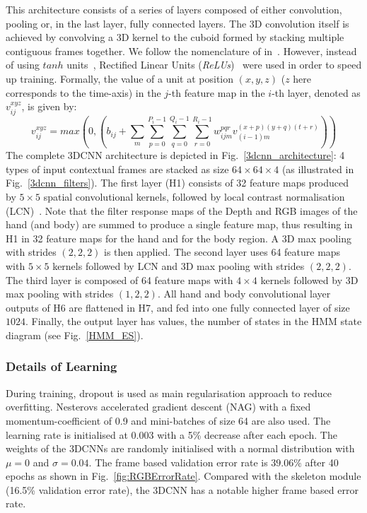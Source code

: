 This  architecture consists of a series of layers composed of either convolution, pooling or, in the last layer, fully connected layers.
The 3D convolution itself is achieved by convolving a 3D kernel to the cuboid formed by stacking multiple contiguous frames together. We follow the nomenclature of in~\cite{ji20133d}.
 However, instead of using $tanh$ units~\cite{ji20133d},  Rectified Linear Units (\emph{ReLUs})~\cite{krizhevsky2012imagenet} were used in order to speed up training.
 Formally, the value of a unit at position $(x, y, z)$ ($z$ here corresponds to the time-axis) in the $j$-th feature map in the $i$-th layer, denoted as $v^{xyz}_{ij}$, is given by:
\begin{equation}
v^{xyz}_{ij} =  max( 0,  ( b_{ij} + \sum_m \sum_{p=0}^{P_i - 1} \sum_{q=0}^{Q_i -1 } \sum_{r=0}^{R_i -1} w^{pqr}_{ijm} v^{(x+p)(y+q)(t+r)}_{(i-1)m} ))
\label{ReLU}
\end{equation}
%
The complete 3DCNN architecture is depicted in Fig.~\ref{3dcnn_architecture}:
4 types of input contextual frames are stacked as size $64\times64\times4$ (as illustrated in Fig.~\ref{3dcnn_filters}).
%
The first layer (H1) consists of 32 feature maps produced by $5\times5$ spatial convolutional kernels,
followed by local contrast normalisation (LCN)~\cite{jarrett2009best}.
%
Note that the filter response maps of the Depth and RGB images of the hand (and body) are summed to produce a single feature map, 
thus resulting in H1 in 32 feature maps for the hand and for the body region.
%
A 3D max pooling with strides $(2,2,2)$ is then applied. 
%
The second layer uses 64 feature maps with $5\times5$ kernels followed by LCN and 3D max pooling with strides $(2,2,2)$. 
The third layer is composed of 64 feature maps with $4\times4$ kernels followed by 3D max pooling with strides $(1,2,2)$. 
All hand and body convolutional layer outputs of H6 are flattened in H7, and fed into one fully connected layer of size $1024$. 
%
Finally, the output layer has \numberhiddenstate values, the number of states in the HMM state diagram (see Fig.~\ref{HMM_ES}).




\subsubsection{Details of Learning}
During training, dropout \cite{hinton2012improving} is used as main regularisation approach to reduce overfitting. 
Nesterovs accelerated gradient descent (NAG) \cite{sutskever2013importance} with a fixed momentum-coefficient of 0.9 and mini-batches of size 64 are also used.
The learning rate is initialised at 0.003 with a 5\% decrease after each epoch. The weights of the 3DCNNs are randomly initialised with a normal distribution with $\mu = 0$ and $\sigma = 0.04$.
The frame based validation error rate is $39.06\%$ after 40 epochs as shown in Fig.~\ref{fig:RGBErrorRate}. 
Compared with the skeleton module (16.5\% validation error rate), the 3DCNN has a notable higher frame based error rate.


